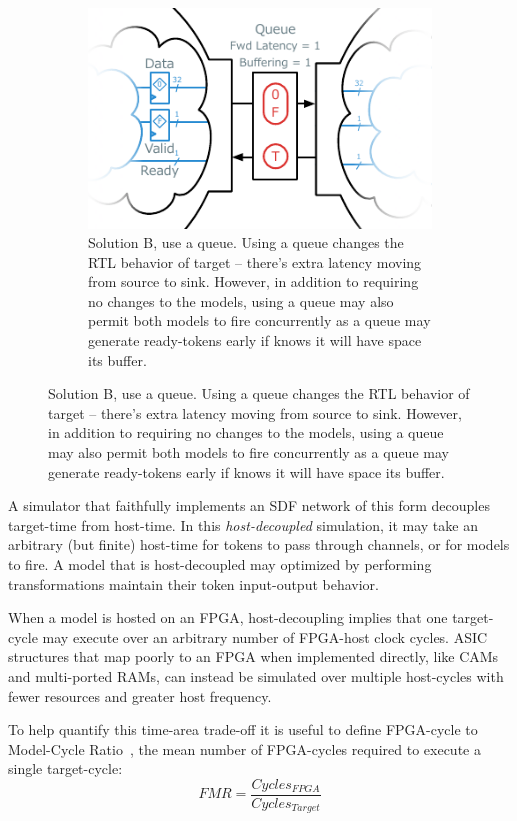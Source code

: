 \begin{figure}
\begin{subfigure}[t]{0.48\textwidth}
    \end{subfigure}\hspace{0.5cm}
    \begin{subfigure}[t]{0.48\textwidth}
        \includegraphics[width=\textwidth]{figures/queue-decoupled-example.pdf}
        \caption{Solution B, use a queue. Using a queue changes the RTL
        behavior of target -- there's extra latency moving from source to sink.
        However, in addition to requiring no changes to the models, using a queue may also
        permit both models to fire concurrently as a queue may generate
        ready-tokens early if knows it will have space its buffer.}
        \label{fig:queue-decoupled-example}
    \end{subfigure}
\end{figure}

A simulator that faithfully implements an SDF network of this form decouples
target-time from host-time. In this \emph{host-decoupled} simulation, it may
take an arbitrary (but finite) host-time for tokens to pass through channels,
or for models to fire. A model that is host-decoupled may optimized by
performing transformations maintain their token input-output behavior.

When a model is hosted on an FPGA, host-decoupling implies that one target-cycle may
execute over an arbitrary number of FPGA-host clock cycles.  ASIC structures
that map poorly to an FPGA when implemented directly, like CAMs and
multi-ported RAMs, can instead be simulated over multiple host-cycles with
fewer resources and greater host frequency.

To help quantify this time-area trade-off it is useful to define FPGA-cycle to
Model-Cycle Ratio~\cite{APorts}, the mean number of FPGA-cycles required to
execute a single target-cycle: $$ FMR = \frac{Cycles_{FPGA}}{Cycles_{Target}}
$$

